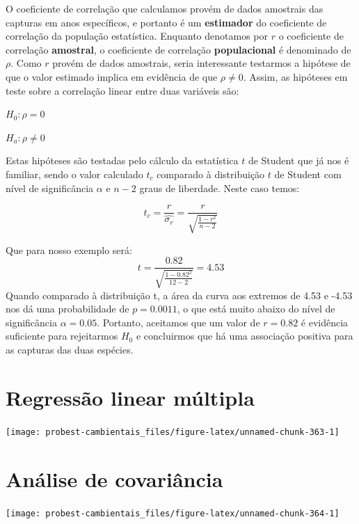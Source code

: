 \documentclass[
]{book}
\begin{document}
O coeficiente de correlação que calculamos provém de dados amostrais das capturas em anos específicos, e portanto é um \textbf{estimador} do coeficiente de correlação da população estatística. Enquanto denotamos por \(r\) o coeficiente de correlação \textbf{amostral}, o coeficiente de correlação \textbf{populacional} é denominado de \(\rho\). Como \(r\) provém de dados amostrais, seria interessante testarmos a hipótese de que o valor estimado implica em evidência de que \(\rho \ne 0\). Assim, as hipóteses em teste sobre a correlação linear entre duas variáveis são:

\(H_0: \rho = 0\)

\(H_a: \rho \ne 0\)

Estas hipóteses são testadas pelo cálculo da estatística \(t\) de Student que já nos é familiar, sendo o valor calculado \(t_c\) comparado à distribuição \(t\) de Student com nível de significância \(\alpha\) e \(n-2\) graus de liberdade. Neste caso temos:

\[t_c = \frac{r}{\hat{\sigma_r}} = \frac{r}{\sqrt{\frac{1-r^2}{n-2}}}\]

Que para nosso exemplo será:
\[t = \frac{0.82}{\sqrt{\frac{1-0.82^2}{12-2}}} = 4.53\]
Quando comparado à distribuição t, a área da curva aos extremos de 4.53 e -4.53 nos dá uma probabilidade de \(p = 0.0011\), o que está muito abaixo do nível de significância \(\alpha = 0.05\). Portanto, aceitamos que um valor de \(r = 0.82\) é evidência suficiente para rejeitarmos \(H_0\) e concluirmos que há uma associação positiva para as capturas das duas espécies.

\hypertarget{regresmultipla}{%
\chapter{Regressão linear múltipla}\label{regresmultipla}}

\begin{center}\texttt{[image: probest-cambientais\_files/figure-latex/unnamed-chunk-363-1]} \end{center}

\hypertarget{ancova}{%
\chapter{Análise de covariância}\label{ancova}}

\begin{center}\texttt{[image: probest-cambientais\_files/figure-latex/unnamed-chunk-364-1]} \end{center}
\end{document}
